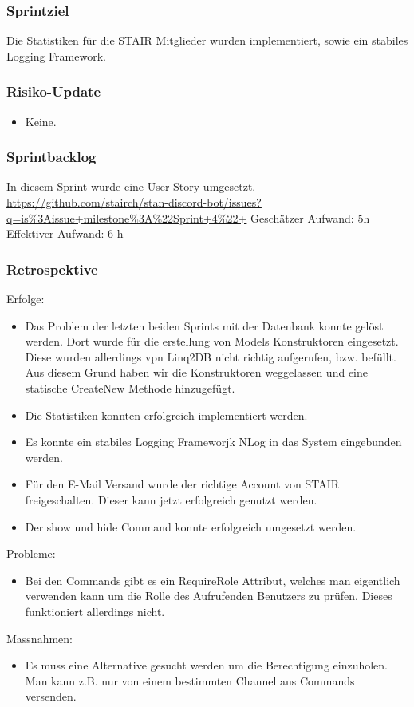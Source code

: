 \documentclass[a4paper, table]{article}
\begin{document}
\subsubsection*{Sprintziel}
Die Statistiken für die STAIR Mitglieder wurden implementiert, sowie ein stabiles Logging Framework.

\subsubsection*{Risiko-Update}
\begin{itemize}
    \item Keine.
\end{itemize}

\subsubsection*{Sprintbacklog}
In diesem Sprint wurde eine User-Story umgesetzt.\\
\url{https://github.com/stairch/stan-discord-bot/issues?q=is%3Aissue+milestone%3A%22Sprint+4%22+}
\newline
Geschätzer Aufwand: 5h
\newline
Effektiver Aufwand: 6 h

\subsubsection*{Retrospektive}
Erfolge:
\begin{itemize}
    \item Das Problem der letzten beiden Sprints mit der Datenbank konnte gelöst werden.
    Dort wurde für die erstellung von Models Konstruktoren eingesetzt.
    Diese wurden allerdings vpn Linq2DB nicht richtig aufgerufen, bzw. befüllt.
    Aus diesem Grund haben wir die Konstruktoren weggelassen und eine statische CreateNew Methode hinzugefügt.
    \item Die Statistiken konnten erfolgreich implementiert werden.
    \item Es konnte ein stabiles Logging Frameworjk NLog in das System eingebunden werden.
    \item Für den E-Mail Versand wurde der richtige Account von STAIR freigeschalten.
    Dieser kann jetzt erfolgreich genutzt werden.
    \item Der show und hide Command konnte erfolgreich umgesetzt werden.
\end{itemize}
Probleme:
\begin{itemize}
    \item Bei den Commands gibt es ein RequireRole Attribut, welches man eigentlich verwenden kann um die Rolle des Aufrufenden Benutzers zu prüfen.
    Dieses funktioniert allerdings nicht.
\end{itemize}
Massnahmen:
\begin{itemize}
    \item Es muss eine Alternative gesucht werden um die Berechtigung einzuholen.
    Man kann z.B. nur von einem bestimmten Channel aus Commands versenden.
\end{itemize}
\end{document}

